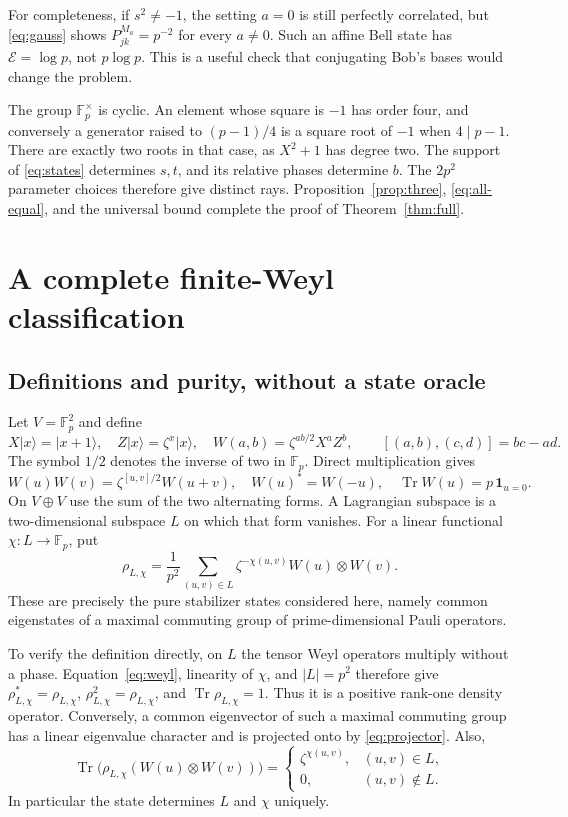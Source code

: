 \documentclass[11pt]{article}
\theoremstyle{remark}\newtheorem{remark}[theorem]{Remark}
\newcommand{\F}{\mathbb F}
\newcommand{\E}{\mathcal E}
\newcommand{\ket}[1]{\lvert#1\rangle}
\DeclareMathOperator{\Tr}{Tr}
\begin{document}
For completeness, if $s^2\ne-1$, the setting $a=0$ is still perfectly correlated, but \eqref{eq:gauss} shows $P^{M_a}_{jk}=p^{-2}$ for every $a\ne0$. Such an affine Bell state has $\E=\log p$, not $p\log p$. This is a useful check that conjugating Bob's bases would change the problem.

The group $\F_p^\times$ is cyclic. An element whose square is $-1$ has order four, and conversely a generator raised to $(p-1)/4$ is a square root of $-1$ when $4\mid p-1$. There are exactly two roots in that case, as $X^2+1$ has degree two. The support of \eqref{eq:states} determines $s,t$, and its relative phases determine $b$. The $2p^2$ parameter choices therefore give distinct rays. Proposition~\ref{prop:three}, \eqref{eq:all-equal}, and the universal bound complete the proof of Theorem~\ref{thm:full}.

\section{A complete finite-Weyl classification}\label{sec:stabilizer}
\subsection{Definitions and purity, without a state oracle}
Let $V=\F_p^2$ and define
\[
 X\ket{x}=\ket{x+1},\quad Z\ket{x}=\zeta^x\ket{x},\quad
 W(a,b)=\zeta^{ab/2}X^a Z^b,
 \qquad [(a,b),(c,d)]=bc-ad.
\]
The symbol $1/2$ denotes the inverse of two in $\F_p$. Direct multiplication gives
\begin{equation}\label{eq:weyl}
 W(u)W(v)=\zeta^{[u,v]/2}W(u+v),\quad
 W(u)^*=W(-u),\quad \Tr W(u)=p\,\mathbf1_{u=0}.
\end{equation}
On $V\oplus V$ use the sum of the two alternating forms. A Lagrangian subspace is a two-dimensional subspace $L$ on which that form vanishes. For a linear functional $\chi:L\to\F_p$, put
\begin{equation}\label{eq:projector}
 \rho_{L,\chi}=\frac1{p^2}\sum_{(u,v)\in L}\zeta^{-\chi(u,v)}W(u)\otimes W(v).
\end{equation}
These are precisely the pure stabilizer states considered here, namely common eigenstates of a maximal commuting group of prime-dimensional Pauli operators.

To verify the definition directly, on $L$ the tensor Weyl operators multiply without a phase. Equation~\eqref{eq:weyl}, linearity of $\chi$, and $|L|=p^2$ therefore give $\rho_{L,\chi}^*=\rho_{L,\chi}$, $\rho_{L,\chi}^2=\rho_{L,\chi}$, and $\Tr\rho_{L,\chi}=1$. Thus it is a positive rank-one density operator. Conversely, a common eigenvector of such a maximal commuting group has a linear eigenvalue character and is projected onto by \eqref{eq:projector}. Also,
\begin{equation}\label{eq:expect}
 \Tr\bigl(\rho_{L,\chi}(W(u)\otimes W(v))\bigr)
 =\begin{cases}\zeta^{\chi(u,v)},&(u,v)\in L,\\0,&(u,v)\notin L.\end{cases}
\end{equation}
In particular the state determines $L$ and $\chi$ uniquely.
\end{document}
